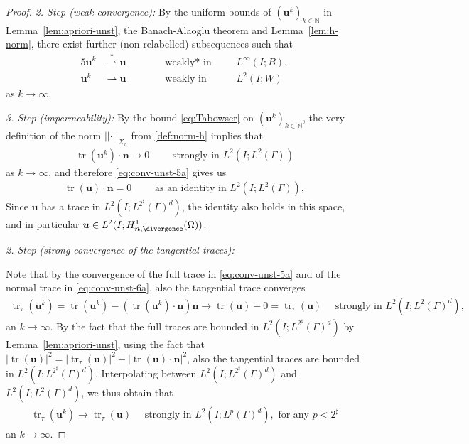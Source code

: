 \documentclass[reqno,a4paper]{amsart}
\def\abs#1{\left| #1 \right|}
\def\norm#1{\left|\!\left| #1 \right|\!\right|}
\def\vec#1{\boldsymbol{#1}}
\def\tr{\mathop{\mathrm{tr}}\nolimits}
\def\Hdivn{ H^1_{\bn,\divergence}(\Omega)}
\def\bn{\vec{n}}
\def\bu{\vec{u}}
\begin{document}
\begin{proof}
	\textit{2. Step (weak convergence):}
	By the uniform bounds of $({\bu}^k)_{k \in \mathbb{N}}$ in Lemma~\ref{lem:apriori-unst}, the Banach-Alaoglu theorem and Lemma~\ref{lem:h-norm}, there exist further (non-relabelled) subsequences such that 
	\begin{alignat}{5} \label{eq:conv-unst-5c}
		\bu^k &\overset{*}{\rightharpoonup}  \bu \qquad &&\text{ weakly* in } \;\; &&L^{\infty}(I;B),\\
		\label{eq:conv-unst-5d}
		\bu^k &\rightharpoonup    \bu \quad &&\text{ weakly in } &&L^{2}(I;W)
	\end{alignat}
	as $k \to \infty$. 
	
	\textit{3. Step (impermeability):}
	By the bound \eqref{eq:Tabowser} on $( \bu^k)_{k \in \mathbb{N}}$, the very definition of the norm $\norm{\cdot}_{X_h}$ from \eqref{def:norm-h} implies that
	\begin{align}\label{eq:conv-unst-6a}
		\tr (\bu^k) \cdot \bn \to 0 \qquad \text{ strongly in } L^2(I;L^2(\Gamma))
	\end{align}
	as $k \to \infty$, and therefore \eqref{eq:conv-unst-5a} gives us 
	\begin{align}\label{eq:Tabretto}
		\tr(\bu) \cdot \bn = 0\qquad\text{ as an identity in $L^2(I;L^2(\Gamma))$}, 
	\end{align}
	Since $\bu$ has a trace in $L^{2}(I;L^{2^\sharp}(\Gamma)^d)$, the identity also holds in this space, and in particular $\bu \in L^2(I;\Hdivn)$. 
	
	\textit{2. Step (strong convergence of the tangential traces):}
	
	Note that by the convergence of the full trace in \eqref{eq:conv-unst-5a} and of the normal trace in \eqref{eq:conv-unst-6a}, also the tangential trace converges 
		\begin{align}\label{eq:conv-unst-6b1}
			\tr_{\tau}(\bu^k) = \tr(\bu^k) - (\tr(\bu^k) \cdot \bn) \bn  \to \tr(\bu) - 0 = \tr_{\tau}(\bu) \quad \text{ strongly in } L^2(I;L^2(\Gamma)^d),  
		\end{align}
		an $k \to \infty$. 
		By the fact that the full traces are bounded in $L^2(I;L^{2^\sharp}(\Gamma)^d)$ by Lemma~\ref{lem:apriori-unst}, using the fact that $\abs{\tr(\bu)}^2 = \abs{\tr_\tau(\bu)}^2 + \abs{\tr(\bu) \cdot \bn}^2$, also the tangential traces are bounded in $L^2(I;L^{2^\sharp}(\Gamma)^d)$. 
		Interpolating between $L^2(I;L^{2^\sharp}(\Gamma)^d)$ and $L^2(I;L^2(\Gamma)^d)$, we thus obtain that 
		\begin{align}\label{eq:conv-unst-6b2}
			\tr_{\tau}(\bu^k) \to \tr_{\tau}(\bu) \quad \text{ strongly in } L^2(I;L^p(\Gamma)^d),  \text{ for any } p < 2^{\sharp}
		\end{align}
		an $k \to \infty$. 
	

\end{proof}
\end{document}
